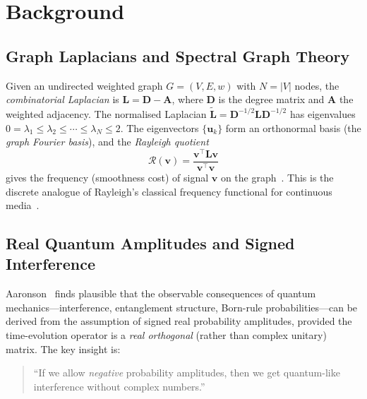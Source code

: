 \documentclass[11pt,a4paper]{article}
\newcommand{\Lmat}{\mathbf{L}}
\newcommand{\T}{^{\intercal}}
\begin{document}
\section{Background}
\label{sec:background}

\subsection{Graph Laplacians and Spectral Graph Theory}
\label{sec:background:laplacian}

Given an undirected weighted graph $G=(V,E,w)$ with $N=|V|$ nodes, the
\emph{combinatorial Laplacian} is $\Lmat = \mathbf{D} - \mathbf{A}$, where
$\mathbf{D}$ is the degree matrix and $\mathbf{A}$ the weighted adjacency.
The normalised Laplacian $\tilde{\Lmat} = \mathbf{D}^{-1/2}\Lmat\mathbf{D}^{-1/2}$
has eigenvalues $0 = \lambda_1 \leq \lambda_2 \leq \cdots \leq \lambda_N \leq 2$.
The eigenvectors $\{\mathbf{u}_k\}$ form an orthonormal basis (the \emph{graph Fourier
basis}), and the \emph{Rayleigh quotient}
\begin{equation}
  \mathcal{R}(\mathbf{v}) = \frac{\mathbf{v}\T\Lmat\mathbf{v}}{\mathbf{v}\T\mathbf{v}}
  \label{eq:rayleigh}
\end{equation}
gives the frequency (smoothness cost) of signal $\mathbf{v}$ on the graph~\cite{chung1997}.
This is the discrete analogue of Rayleigh's classical frequency functional for
continuous media~\cite{rayleigh1877}.

\subsection{Real Quantum Amplitudes and Signed Interference}
\label{sec:background:quantum}

Aaronson~\cite{aaronson2013} finds plausible that the observable consequences of
quantum mechanics---interference, entanglement structure, Born-rule probabilities---can
be derived from the assumption of signed real probability amplitudes, provided
the time-evolution operator is a \emph{real orthogonal} (rather than complex unitary)
matrix.  The key insight is:

\begin{quote}
  ``If we allow \emph{negative} probability amplitudes, then we get
  quantum-like interference without complex numbers.'' \cite{aaronson2013}
\end{quote}
\end{document}
